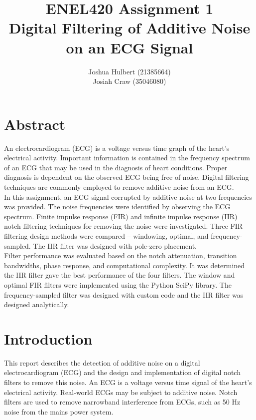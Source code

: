 \documentclass[12pt]{article}
\title{{\huge \textbf{ENEL420 Assignment 1}}\vspace{20pt}\\Digital Filtering of Additive Noise on an ECG Signal\vspace{24pt}}
\author{\large Joshua Hulbert (21385664)\\\vspace{12pt}\large Josiah Craw (35046080)}
\begin{document}
\maketitle
\thispagestyle{empty}

\newpage
\section*{Abstract}
An electrocardiogram (ECG) is a voltage versus time graph of the heart’s electrical activity. Important information is contained in
the frequency spectrum of an ECG that may be used in the diagnosis of heart conditions. Proper diagnosis is dependent on the observed 
ECG being free of noise. Digital filtering techniques are commonly employed to remove additive noise from an ECG.\\

\noindent In this assignment, an ECG signal corrupted by additive noise at two frequencies was provided. The noise frequencies were
identified by observing the ECG spectrum. Finite impulse response (FIR) and infinite impulse response (IIR) notch filtering techniques
for removing the noise were investigated. Three FIR filtering design methods were compared – windowing, optimal, and frequency-sampled.
The IIR filter was designed with pole-zero placement.\\ 

\noindent Filter performance was evaluated based on the notch attenuation, transition bandwidths, phase response, and computational
complexity. It was determined the IIR filter gave the best performance of the four filters. The window and optimal FIR filters were
implemented using the Python SciPy library. The frequency-sampled filter was designed with custom code and the IIR filter was designed
analytically. 

\newpage
{}

\section{Introduction}
This report describes the detection of additive noise on a digital electrocardiogram (ECG) and the design and implementation of digital
notch filters to remove this noise. An ECG is a voltage versus time signal of the heart’s electrical activity. Real-world ECGs may be
subject to additive noise. Notch filters are used to remove narrowband interference from ECGs, such as 50 Hz noise from the mains power
system.\\
\end{document}
